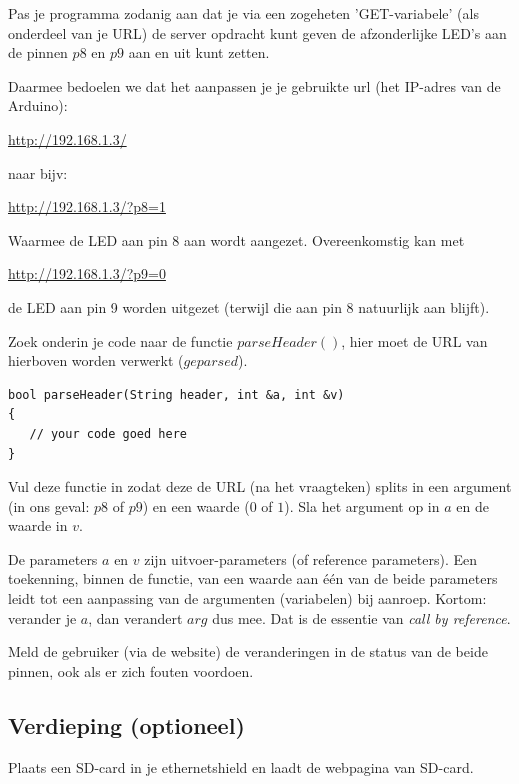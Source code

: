 \begin{exercise}
Pas je programma zodanig aan dat je via een zogeheten 'GET-variabele' (als onderdeel van je URL) de server opdracht kunt geven de afzonderlijke LED’s aan de pinnen $p8$ en $p9$ aan en uit kunt zetten. 

Daarmee bedoelen we dat het aanpassen je je gebruikte url (het IP-adres van de Arduino):

\url{http://192.168.1.3/} 

naar bijv: 

\url{http://192.168.1.3/?p8=1}

Waarmee de LED aan pin 8 aan wordt aangezet. Overeenkomstig kan met

\url{http://192.168.1.3/?p9=0} 

de LED aan pin 9 worden uitgezet (terwijl die aan pin 8 natuurlijk aan blijft). 

Zoek onderin je code naar de functie $parseHeader()$, hier moet de URL van hierboven worden verwerkt ($geparsed$). 

\begin{lstlisting}[language=Arduino, numbers=none]
bool parseHeader(String header, int &a, int &v)
{
   // your code goed here 
}
\end{lstlisting}
Vul deze functie in zodat deze de URL (na het vraagteken) splits in een argument (in ons geval: $p8$ of $p9$) en een waarde ($0$ of $1$). Sla het argument op in $a$ en de waarde in $v$. 

\begin{remark}
De parameters $a$ en $v$ zijn uitvoer-parameters (of reference parameters). Een toekenning, binnen de functie, van een waarde aan één van de beide parameters leidt tot een aanpassing van de argumenten (variabelen) bij aanroep. Kortom: verander je $a$, dan verandert $arg$ dus mee. Dat is de essentie van \textit{call by reference}. 
\end{remark}

Meld de gebruiker (via de website) de veranderingen in de status van de beide pinnen, ook als er zich fouten voordoen.
\end{exercise}

\subsection{Verdieping (optioneel)}
\vspace{5mm} 

\begin{exercise}
Plaats een SD-card in je ethernetshield en laadt de webpagina van SD-card.
\end{exercise}


